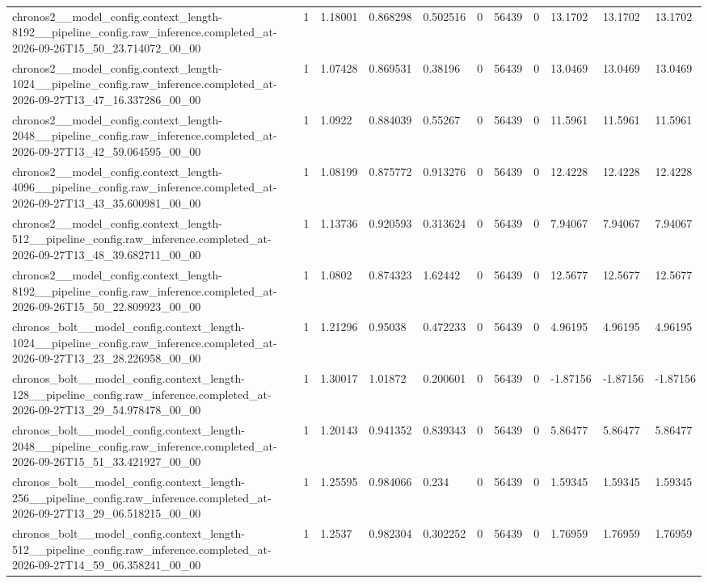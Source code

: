 \begin{tabular}{lllllllllll}
chronos2\_\_model\_config.context\_length-8192\_\_pipeline\_config.raw\_inference.completed\_at-2026-09-26T15\_50\_23.714072\_00\_00 & 1 & 1.18001 & 0.868298 & 0.502516 & 0 & 56439 & 0 & 13.1702 & 13.1702 & 13.1702 \\
chronos2\_\_model\_config.context\_length-1024\_\_pipeline\_config.raw\_inference.completed\_at-2026-09-27T13\_47\_16.337286\_00\_00 & 1 & 1.07428 & 0.869531 & 0.38196 & 0 & 56439 & 0 & 13.0469 & 13.0469 & 13.0469 \\
chronos2\_\_model\_config.context\_length-2048\_\_pipeline\_config.raw\_inference.completed\_at-2026-09-27T13\_42\_59.064595\_00\_00 & 1 & 1.0922 & 0.884039 & 0.55267 & 0 & 56439 & 0 & 11.5961 & 11.5961 & 11.5961 \\
chronos2\_\_model\_config.context\_length-4096\_\_pipeline\_config.raw\_inference.completed\_at-2026-09-27T13\_43\_35.600981\_00\_00 & 1 & 1.08199 & 0.875772 & 0.913276 & 0 & 56439 & 0 & 12.4228 & 12.4228 & 12.4228 \\
chronos2\_\_model\_config.context\_length-512\_\_pipeline\_config.raw\_inference.completed\_at-2026-09-27T13\_48\_39.682711\_00\_00 & 1 & 1.13736 & 0.920593 & 0.313624 & 0 & 56439 & 0 & 7.94067 & 7.94067 & 7.94067 \\
chronos2\_\_model\_config.context\_length-8192\_\_pipeline\_config.raw\_inference.completed\_at-2026-09-26T15\_50\_22.809923\_00\_00 & 1 & 1.0802 & 0.874323 & 1.62442 & 0 & 56439 & 0 & 12.5677 & 12.5677 & 12.5677 \\
chronos\_bolt\_\_model\_config.context\_length-1024\_\_pipeline\_config.raw\_inference.completed\_at-2026-09-27T13\_23\_28.226958\_00\_00 & 1 & 1.21296 & 0.95038 & 0.472233 & 0 & 56439 & 0 & 4.96195 & 4.96195 & 4.96195 \\
chronos\_bolt\_\_model\_config.context\_length-128\_\_pipeline\_config.raw\_inference.completed\_at-2026-09-27T13\_29\_54.978478\_00\_00 & 1 & 1.30017 & 1.01872 & 0.200601 & 0 & 56439 & 0 & -1.87156 & -1.87156 & -1.87156 \\
chronos\_bolt\_\_model\_config.context\_length-2048\_\_pipeline\_config.raw\_inference.completed\_at-2026-09-26T15\_51\_33.421927\_00\_00 & 1 & 1.20143 & 0.941352 & 0.839343 & 0 & 56439 & 0 & 5.86477 & 5.86477 & 5.86477 \\
chronos\_bolt\_\_model\_config.context\_length-256\_\_pipeline\_config.raw\_inference.completed\_at-2026-09-27T13\_29\_06.518215\_00\_00 & 1 & 1.25595 & 0.984066 & 0.234 & 0 & 56439 & 0 & 1.59345 & 1.59345 & 1.59345 \\
chronos\_bolt\_\_model\_config.context\_length-512\_\_pipeline\_config.raw\_inference.completed\_at-2026-09-27T14\_59\_06.358241\_00\_00 & 1 & 1.2537 & 0.982304 & 0.302252 & 0 & 56439 & 0 & 1.76959 & 1.76959 & 1.76959 \\

\end{tabular}

